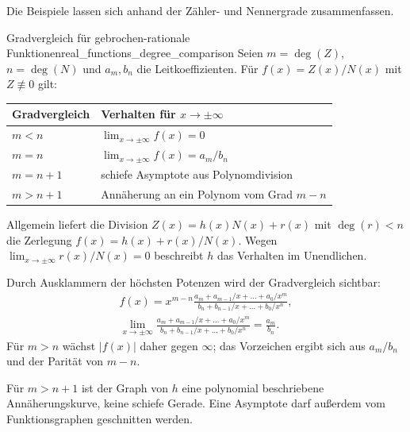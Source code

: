 Die Beispiele lassen sich anhand der Zähler- und Nennergrade zusammenfassen.
\begin{TheoremBox}{Gradvergleich für gebrochen-rationale Funktionen}{real_functions_degree_comparison}
  Seien $m=\deg(Z)$, $n=\deg(N)$ und $a_m,b_n$ die Leitkoeffizienten.
  Für $f(x)=Z(x)/N(x)$ mit $Z\not\equiv0$ gilt:
  \begin{center}
    \renewcommand{\arraystretch}{1.5}
    \begin{tabular}{@{}ll@{}}
      \toprule
      Gradvergleich & Verhalten für $x\to\pm\infty$\\ \midrule
      $m<n$ & $\lim_{x\to\pm\infty}f(x)=0$\\
      $m=n$ & $\lim_{x\to\pm\infty}f(x)=a_m/b_n$\\
      $m=n+1$ & schiefe Asymptote aus Polynomdivision\\
      $m>n+1$ & Annäherung an ein Polynom vom Grad $m-n$\\
      \bottomrule
    \end{tabular}
  \end{center}
  Allgemein liefert die Division $Z(x)=h(x)N(x)+r(x)$ mit $\deg(r)<n$
  die Zerlegung $f(x)=h(x)+r(x)/N(x)$. Wegen $\lim_{x\to\pm\infty}r(x)/N(x)=0$ beschreibt $h$
  das Verhalten im Unendlichen.
\end{TheoremBox}
Durch Ausklammern der höchsten Potenzen wird der Gradvergleich sichtbar:
\[
  \begin{gathered}
    f(x)=x^{m-n}
    \frac{a_m+a_{m-1}/x+\dots+a_0/x^m}
         {b_n+b_{n-1}/x+\dots+b_0/x^n},\\[0.6em]
    \lim_{x\to\pm\infty}
      \frac{a_m+a_{m-1}/x+\dots+a_0/x^m}
           {b_n+b_{n-1}/x+\dots+b_0/x^n}=\frac{a_m}{b_n}.
  \end{gathered}
\]
Für $m>n$ wächst $|f(x)|$ daher gegen $\infty$; das Vorzeichen ergibt
sich aus $a_m/b_n$ und der Parität von $m-n$.

\begin{RemarkBox}[remark title=Form und Schnittpunkte von Asymptoten]
  Für $m>n+1$ ist der Graph von $h$ eine polynomial beschriebene
  Annäherungskurve, keine schiefe Gerade. Eine Asymptote darf außerdem
  vom Funktionsgraphen geschnitten werden.
\end{RemarkBox}
